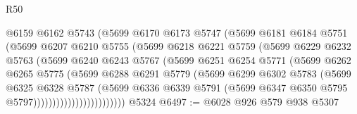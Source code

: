 \begin{lexlean}{R50}
\begin{coremodule}
                          @6159
                          @6162
                          @5743
                          (@5699
                            @6170
                            @6173
                            @5747
                            (@5699
                              @6181
                              @6184
                              @5751
                              (@5699
                                @6207
                                @6210
                                @5755
                                (@5699
                                  @6218
                                  @6221
                                  @5759
                                  (@5699
                                    @6229
                                    @6232
                                    @5763
                                    (@5699
                                      @6240
                                      @6243
                                      @5767
                                      (@5699
                                        @6251
                                        @6254
                                        @5771
                                        (@5699
                                          @6262
                                          @6265
                                          @5775
                                          (@5699
                                            @6288
                                            @6291
                                            @5779
                                            (@5699
                                              @6299
                                              @6302
                                              @5783
                                              (@5699
                                                @6325
                                                @6328
                                                @5787
                                                (@5699
                                                  @6336
                                                  @6339
                                                  @5791
                                                  (@5699
                                                    @6347
                                                    @6350
                                                    @5795
                                                    @5797))))))))))))))))))))))))
    @5324
@6497 := @6028 @926 @579 @938 @5307

\end{coremodule}
\end{lexlean}
